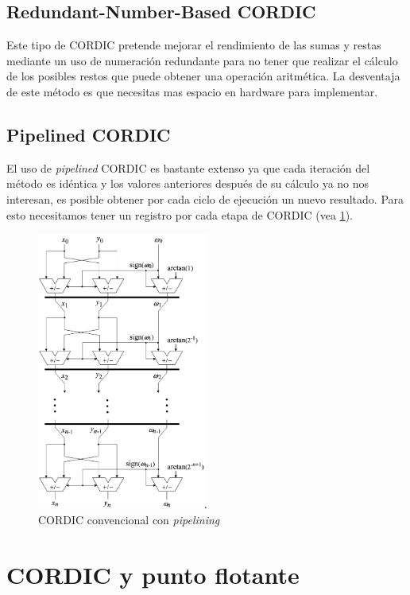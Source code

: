 \subsection{Redundant-Number-Based CORDIC}
Este tipo de CORDIC pretende mejorar el rendimiento de las sumas y restas mediante un uso de numeración redundante para no tener que realizar el cálculo de los posibles restos que puede obtener una operación aritmética. La desventaja de este método es que necesitas mas espacio en hardware para implementar.

\subsection{Pipelined CORDIC}
El uso de \textit{pipelined} CORDIC es bastante extenso ya que cada iteración del método es idéntica y los valores anteriores después de su cálculo ya no nos interesan, es posible obtener por cada ciclo de ejecución un nuevo resultado. Para esto necesitamos tener un registro por cada etapa de CORDIC (vea \ref{graf:2009-CORDIC_pipelined}).

\begin{figure}[ht]
	\centering
	\includegraphics[width=0.50\textwidth]{archivos/CORDIC/2009-CORDIC_pipelined.png}
	\caption{CORDIC convencional con \textit{pipelining}}
	\label{graf:2009-CORDIC_pipelined}
\end{figure}

\section{CORDIC y punto flotante}

